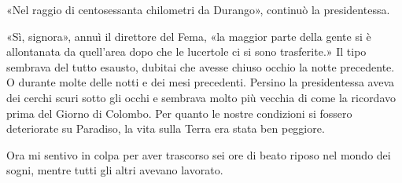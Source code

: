«Nel raggio di centosessanta chilometri da Durango», continuò la
presidentessa.

«Sì, signora», annuì il direttore del Fema, «la maggior parte della
gente si è allontanata da quell'area dopo che le lucertole ci si sono
trasferite.» Il tipo sembrava del tutto esausto, dubitai che avesse
chiuso occhio la notte precedente. O durante molte delle notti e dei
mesi precedenti. Persino la presidentessa aveva dei cerchi scuri sotto
gli occhi e sembrava molto più vecchia di come la ricordavo prima del
Giorno di Colombo. Per quanto le nostre condizioni si fossero
deteriorate su Paradiso, la vita sulla Terra era stata ben peggiore.

Ora mi sentivo in colpa per aver trascorso sei ore di beato riposo nel
mondo dei sogni, mentre tutti gli altri avevano lavorato.